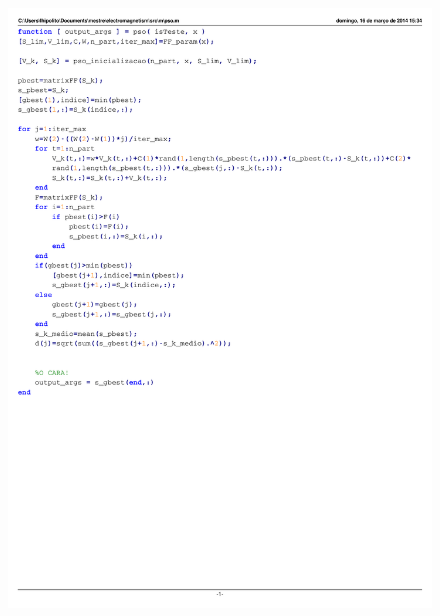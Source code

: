 \documentclass{IEEEtran}
\begin{document}
\begin{figure}
	\centering
	\includegraphics{pso.pdf}
	\label{pso}
\end{figure}
\end{document}
